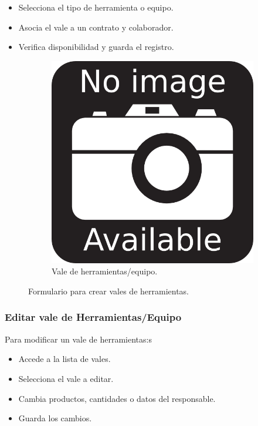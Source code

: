 \begin{itemize}
    \item Selecciona el tipo de herramienta o equipo.
    \item Asocia el vale a un contrato y colaborador.
    \item Verifica disponibilidad y guarda el registro.
\end{itemize}

\begin{figure}[h]
\centering
\begin{subfigure}{0.4\textwidth}
    \includegraphics[width=\textwidth]{imgs/no-image.png}
    \caption{Vale de herramientas/equipo.}
    \label{fig:operaciones4}
\end{subfigure}
\caption{Formulario para crear vales de herramientas.}
\end{figure}

\subsubsection{Editar vale de Herramientas/Equipo}

Para modificar un vale de herramientas:s

\begin{itemize}
    \item Accede a la lista de vales.
    \item Selecciona el vale a editar.
    \item Cambia productos, cantidades o datos del responsable.
    \item Guarda los cambios.
\end{itemize}

